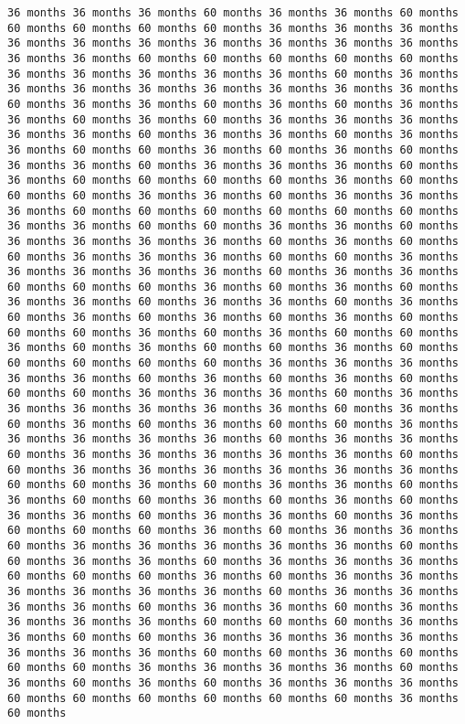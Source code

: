 \documentclass[11pt]{article}
\begin{document}
\begin{Verbatim}[commandchars=\\\{\}, frame=single, framerule=2mm, rulecolor=\color{outerrorbackground}]
36 months 36 months 36 months 60 months 36 months 36 months 60 months 60 months 60 months 60 months 60 months 36 months 36 months 36 months 36 months 36 months 36 months 36 months 36 months 36 months 36 months 36 months 36 months 60 months 60 months 60 months 60 months 60 months 36 months 36 months 36 months 36 months 36 months 60 months 36 months 36 months 36 months 36 months 36 months 36 months 36 months 36 months 60 months 36 months 36 months 60 months 36 months 60 months 36 months 36 months 60 months 36 months 60 months 36 months 36 months 36 months 36 months 36 months 60 months 36 months 36 months 60 months 36 months 36 months 60 months 60 months 36 months 60 months 36 months 60 months 36 months 36 months 60 months 36 months 36 months 36 months 60 months 36 months 60 months 60 months 60 months 60 months 36 months 60 months 60 months 60 months 36 months 36 months 60 months 36 months 36 months 36 months 60 months 60 months 60 months 60 months 60 months 60 months 36 months 36 months 60 months 60 months 36 months 36 months 60 months 36 months 36 months 36 months 36 months 60 months 36 months 60 months 60 months 36 months 36 months 36 months 60 months 60 months 36 months 36 months 36 months 36 months 36 months 60 months 36 months 36 months 60 months 60 months 60 months 36 months 60 months 36 months 60 months 36 months 36 months 60 months 36 months 36 months 60 months 36 months 60 months 36 months 60 months 36 months 60 months 36 months 60 months 60 months 60 months 36 months 60 months 36 months 60 months 60 months 36 months 60 months 36 months 60 months 60 months 36 months 60 months 60 months 60 months 60 months 60 months 36 months 36 months 36 months 36 months 36 months 60 months 36 months 60 months 36 months 60 months 60 months 60 months 36 months 36 months 36 months 60 months 36 months 36 months 36 months 36 months 36 months 36 months 60 months 36 months 60 months 36 months 60 months 36 months 60 months 60 months 36 months 36 months 36 months 36 months 36 months 60 months 36 months 36 months 60 months 36 months 36 months 36 months 36 months 36 months 60 months 60 months 36 months 36 months 36 months 36 months 36 months 36 months 60 months 60 months 36 months 60 months 36 months 36 months 60 months 36 months 60 months 60 months 36 months 60 months 36 months 60 months 36 months 36 months 60 months 36 months 36 months 60 months 36 months 60 months 60 months 60 months 36 months 60 months 36 months 36 months 60 months 36 months 36 months 36 months 36 months 36 months 60 months 60 months 36 months 36 months 60 months 36 months 36 months 36 months 60 months 60 months 60 months 36 months 60 months 36 months 36 months 36 months 36 months 36 months 36 months 60 months 36 months 36 months 36 months 36 months 60 months 36 months 36 months 60 months 36 months 36 months 36 months 36 months 60 months 60 months 60 months 36 months 36 months 60 months 60 months 36 months 36 months 36 months 36 months 36 months 36 months 36 months 60 months 60 months 36 months 60 months 60 months 60 months 36 months 36 months 36 months 36 months 60 months 36 months 60 months 36 months 60 months 36 months 36 months 36 months 60 months 60 months 60 months 60 months 60 months 60 months 36 months 60 months 
\end{Verbatim}
\end{document}
